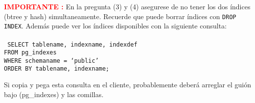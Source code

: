 \documentclass[11pt,a4paper]{article}
\begin{document}
\noindent
\textcolor{red}{{\bf IMPORTANTE :}} En la pregunta (3) y (4) asegurese de no tener los dos índices (btree y hash) simultaneamente. Recuerde que puede borrar índices con {\tt DROP INDEX}. Además puede ver los índices disponibles con la siguiente consulta:\\\\
{\tt
SELECT tablename, indexname, indexdef \\
FROM pg\_indexes \\
WHERE schemaname = `public' \\
ORDER BY tablename, indexname; \\
}

Si copia y pega esta consulta en el cliente, probablemente deberá arreglar el guión bajo (pg\_indexes) y las comillas. 
\end{document}
